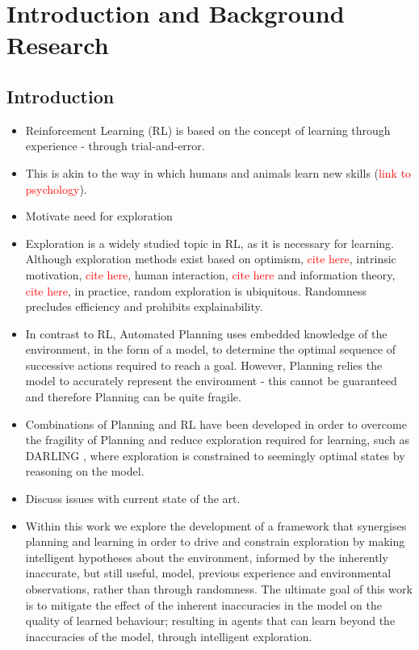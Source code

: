 
\chapter{Introduction and Background Research}

\label{chapter1}
\section{Introduction}
\begin{itemize}
    \item Reinforcement Learning (RL) is based on the concept of learning through experience - through trial-and-error.
    \item  This is akin to the way in which humans and animals learn new skills (\textcolor{red}{link to psychology}).
    \item Motivate need for exploration
    \item Exploration is a widely studied topic in RL, as it is necessary for learning. Although exploration methods exist based on optimism, \textcolor{red}{cite here}, intrinsic motivation, \textcolor{red}{cite here}, human interaction, \textcolor{red}{cite here} and information theory, \textcolor{red}{cite here}, in practice, random exploration is ubiquitous. Randomness precludes efficiency and prohibits explainability.
    \item In contrast to RL, Automated Planning uses embedded knowledge of the environment, in the form of a model, to determine the optimal sequence of successive actions required to reach a goal. However, Planning relies the model to accurately represent  the environment - this cannot be guaranteed and therefore Planning can be quite fragile.
    \item Combinations of Planning and RL have been developed in order to overcome the fragility of Planning and reduce exploration required for learning, such as DARLING \cite{AIJ16-leonetti}, where exploration is constrained to seemingly optimal states by reasoning on the model.
    \item Discuss issues with current state of the art.
    \item Within this work we explore the development of a framework that synergises planning and learning in order to drive and constrain exploration by making intelligent hypotheses about the environment, informed by the inherently inaccurate, but still useful, model, previous experience and environmental observations, rather than through randomness. The ultimate goal of this work is to mitigate the effect of the inherent inaccuracies in the model on the quality of learned behaviour; resulting in agents that can learn beyond the inaccuracies of the model, through intelligent exploration.
\end{itemize}
